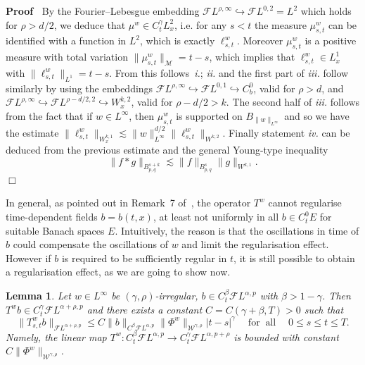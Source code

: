 \documentclass[10pt]{article}
\newcommand{\tmop}[1]{\ensuremath{\operatorname{#1}}}
\newcommand{\tmtextit}[1]{{\itshape{#1}}}
\newenvironment{proof}{\noindent\textbf{Proof\ }}{\hspace*{\fill}$\Box$\medskip}
\newtheorem{lemma}[theorem]{Lemma}
\begin{document}
\begin{proof}
  By the Fourier--Lebesgue embedding $\mathcal{F} L^{\rho, \infty}
  \hookrightarrow \mathcal{F} L^{0, 2} = L^2$ which holds for $\rho > d / 2$,
  we deduce that $\mu^w \in C^{\gamma}_t L^2_x$, i.e. for any $s < t$ the
  measure $\mu_{s, t}^w$ can be identified with a function in $L^2$, which is
  exactly $\ell^w_{s, t}$. Moreover $\mu^w_{s, t}$ is a positive measure with
  total variation $\| \mu^w_{s, t} \|_{\mathcal{M}} = t - s$, which implies
  that $\ell^w_{s, t} \in L^1_x$ with $\| \ell^w_{s, t} \|_{L^1} = t - s$.
  From this follows~\tmtextit{i.}; \tmtextit{ii.} and the first part of
  \tmtextit{iii.} follow similarly by using the embeddings $\mathcal{F}
  L^{\rho, \infty} \hookrightarrow \mathcal{F} L^{0, 1} \hookrightarrow
  C^0_b$, valid for $\rho > d$, and $\mathcal{F} L^{\rho, \infty}
  \hookrightarrow \mathcal{F} L^{\rho - d / 2, 2} \hookrightarrow W^{k, 2}_x$,
  valid for $\rho - d / 2 > k$. The second half of \tmtextit{iii.} follows
  from the fact that if $w \in L^{\infty}$, then $\mu^w_{s, t}$ is supported
  on $B_{\| w \|_{L^{\infty}}}$ and so we have the estimate $\| \ell^w_{s, t}
  \|_{W^{k, 1}_x} \lesssim \| w \|_{L^{\infty}}^{d / 2} \| \ell^w_{s, t}
  \|_{W^{k, 2}}$. Finally statement \tmtextit{iv.} can be deduced from the
  previous estimate and the general Young\mbox{-}type inequality
  \[ \| f \ast g \|_{B^{s + k}_{p, q}} \lesssim \| f \|_{B^s_{p, q}}  \| g
     \|_{W^{k, 1}} . \]
\end{proof}

In general, as pointed out in Remark~7 of~{\cite{galeatigubinelli_ode}}, the
operator $T^w$ cannot regularise time\mbox{-}dependent fields $b = b (t, x)$,
at least not uniformly in all $b \in C^0_t E$ for suitable Banach spaces $E$.
Intuitively, the reason is that the oscillations in time of $b$ could
compensate the oscillations of $w$ and limit the regularisation effect.
However if $b$ is required to be sufficiently regular in $t$, it is still
possible to obtain a regularisation effect, as we are going to show now.

\begin{lemma}
  \label{sec2.2 lemma averaging time}Let $w \in L^{\infty}$ be $(\gamma,
  \rho)$\mbox{-}irregular, $b \in C^{\beta}_t \mathcal{F} L^{\alpha, p}$ with
  $\beta > 1 - \gamma$. Then $T^w b \in C^{\gamma}_t \mathcal{F} L^{\alpha +
  \rho, p}$ and there exists a constant $C = C (\gamma + \beta, T) > 0$ such
  that
  \begin{equation}
    \| T^w_{s, t} b \|_{\mathcal{F} L^{\alpha + \rho, p}} \leqslant C \| b
    \|_{C^{\beta} \mathcal{F} L^{\alpha, p}} \| \Phi^w
    \|_{\mathcal{W}^{\gamma, \rho}} | t - s |^{\gamma} \quad \tmop{for}
    \tmop{all} \quad 0 \leqslant s \leqslant t \leqslant T. \label{sec2.2
    lemma time eq1}
  \end{equation}
  Namely, the linear map $T^w : C^{\beta}_t \mathcal{F} L^{\alpha, p}
  \rightarrow C^{\gamma}_t \mathcal{F} L^{\alpha, p + \rho}$ is bounded with
  constant $C \| \Phi^w \|_{\mathcal{W}^{\gamma, \rho}}$.
\end{lemma}
\end{document}
